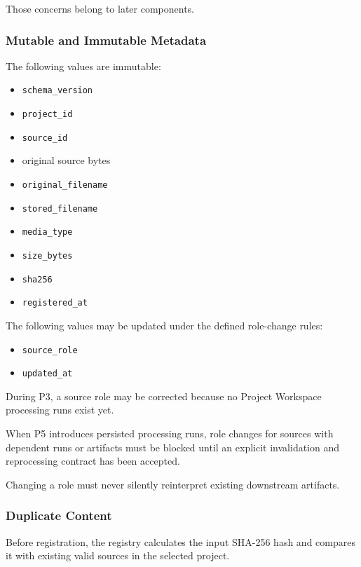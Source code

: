 Those concerns belong to later components.

\hypertarget{mutable-and-immutable-metadata}{%
\subsubsection{Mutable and Immutable Metadata}\label{mutable-and-immutable-metadata}}

The following values are immutable:

\begin{itemize}
\tightlist
\item
  \texttt{schema\_version}
\item
  \texttt{project\_id}
\item
  \texttt{source\_id}
\item
  original source bytes
\item
  \texttt{original\_filename}
\item
  \texttt{stored\_filename}
\item
  \texttt{media\_type}
\item
  \texttt{size\_bytes}
\item
  \texttt{sha256}
\item
  \texttt{registered\_at}
\end{itemize}

The following values may be updated under the defined role-change rules:

\begin{itemize}
\tightlist
\item
  \texttt{source\_role}
\item
  \texttt{updated\_at}
\end{itemize}

During P3, a source role may be corrected because no Project Workspace processing runs exist yet.

When P5 introduces persisted processing runs, role changes for sources with dependent runs or artifacts must be blocked until an explicit invalidation and reprocessing contract has been accepted.

Changing a role must never silently reinterpret existing downstream artifacts.

\hypertarget{duplicate-content}{%
\subsubsection{Duplicate Content}\label{duplicate-content}}

Before registration, the registry calculates the input SHA-256 hash and compares it with existing valid sources in the selected project.

